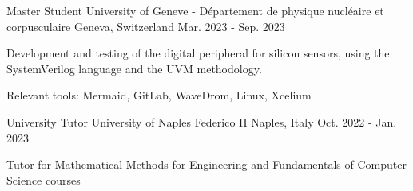 \begin{cventries}
  \cventry
    {Master Student} %
    {University of Geneve - Département de physique nucléaire et corpusculaire} %
    {Geneva, Switzerland} %
    {Mar. 2023 - Sep. 2023} %
    {
      \begin{cvitems} %
        \item {Development and testing of the digital peripheral for silicon sensors, using the SystemVerilog language and the UVM methodology.}
        \item {Relevant tools: Mermaid, GitLab, WaveDrom, Linux, Xcelium}
      \end{cvitems}
    }

  \cventry
    {University Tutor} %
    {University of Naples Federico II} %
    {Naples, Italy} %
    {Oct. 2022 - Jan. 2023} %
    {
      \begin{cvitems} %
        \item {Tutor for Mathematical Methods for Engineering and Fundamentals of Computer Science courses}
      \end{cvitems}
    }


\end{cventries}
